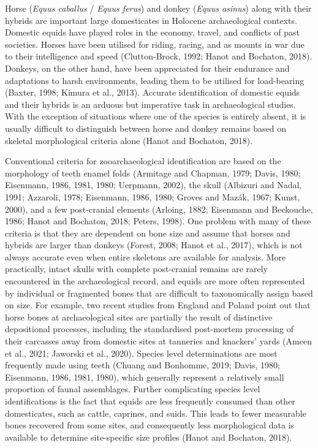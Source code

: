 \documentclass[preprint, 3p, authoryear]{elsarticle} %
\begin{document}
Horse (\emph{Equus caballus} / \emph{Equus ferus}) and donkey (\emph{Equus asinus}) along with their hybrids are important large domesticates in Holocene archaeological contexts. Domestic equids have played roles in the economy, travel, and conflicts of past societies. Horses have been utilised for riding, racing, and as mounts in war due to their intelligence and speed (Clutton-Brock, 1992; Hanot and Bochaton, 2018). Donkeys, on the other hand, have been appreciated for their endurance and adaptations to harsh environments, leading them to be utilised for load-bearing (Baxter, 1998; Kimura et al., 2013). Accurate identification of domestic equids and their hybrids is an arduous but imperative task in archaeological studies. With the exception of situations where one of the species is entirely absent, it is usually difficult to distinguish between horse and donkey remains based on skeletal morphological criteria alone (Hanot and Bochaton, 2018).

Conventional criteria for zooarchaeological identification are based on the morphology of teeth enamel folds (Armitage and Chapman, 1979; Davis, 1980; Eisenmann, 1986, 1981, 1980; Uerpmann, 2002), the skull (Albizuri and Nadal, 1991; Azzaroli, 1978; Eisenmann, 1986, 1980; Groves and Mazák, 1967; Kunst, 2000), and a few post-cranial elements (Arloing, 1882; Eisenmann and Beckouche, 1986; Hanot and Bochaton, 2018; Peters, 1998). One problem with many of these criteria is that they are dependent on bone size and assume that horses and hybrids are larger than donkeys (Forest, 2008; Hanot et al., 2017), which is not always accurate even when entire skeletons are available for analysis. More practically, intact skulls with complete post-cranial remains are rarely encountered in the archaeological record, and equids are more often represented by individual or fragmented bones that are difficult to taxonomically assign based on size. For example, two recent studies from England and Poland point out that horse bones at archaeological sites are partially the result of distinctive depositional processes, including the standardised post-mortem processing of their carcasses away from domestic sites at tanneries and knackers' yards (Ameen et al., 2021; Jaworski et al., 2020). Species level determinations are most frequently made using teeth (Chuang and Bonhomme, 2019; Davis, 1980; Eisenmann, 1986, 1981, 1980), which generally represent a relatively small proportion of faunal assemblages. Further complicating species level identifications is the fact that equids are less frequently consumed than other domesticates, such as cattle, caprines, and suids. This leads to fewer measurable bones recovered from some sites, and consequently less morphological data is available to determine site-specific size profiles (Hanot and Bochaton, 2018).
\end{document}
